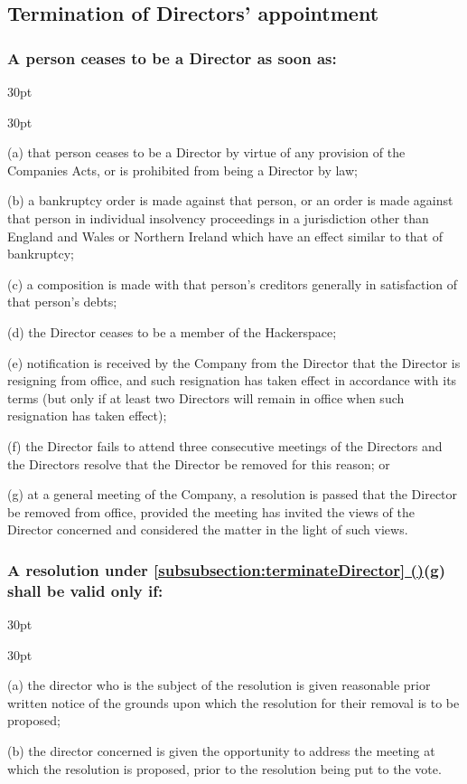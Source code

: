 \documentclass[12pt]{article}
\newcommand*{\fancyref}[1]{\hyperref[{#1}]{\autoref*{#1} (\nameref*{#1})}}
\def\clauseindent{30pt}
\newenvironment{subindentlist}{\raggedright\begin{adjustwidth}{\clauseindent}{}\begin{labeledlist}{\clauseindent}}{\end{labeledlist}\end{adjustwidth}}
\begin{document}
\subsection{Termination of Directors' appointment}
\subsubsection[Automatic termination of Directors]{A person ceases to be a Director as soon as:}\label{subsubsection:terminateDirector}
\begin{subindentlist}
    \item [(a)] that person ceases to be a Director by virtue of any provision of the Companies Acts, or is prohibited from being a Director by law;
    \item [(b)] a bankruptcy order is made against that person, or an order is made against that person in individual insolvency proceedings in a jurisdiction other than England and Wales or Northern Ireland which have an effect similar to that of bankruptcy;
    \item [(c)] a composition is made with that person's creditors generally in satisfaction of that person's debts;
    \item [(d)] the Director ceases to be a member of the Hackerspace;
    \item [(e)] notification is received by the Company from the Director that the Director is resigning from office, and such resignation has taken effect in accordance with its terms (but only if at least two Directors will remain in office when such resignation has taken effect);
    \item [(f)] the Director fails to attend three consecutive meetings of the Directors and the Directors resolve that the Director be removed for this reason; or
    \item [(g)] at a general meeting of the Company, a resolution is passed that the Director be removed from office, provided the meeting has invited the views of the Director concerned and considered the matter in the light of such views.
\end{subindentlist}
\subsubsection[Specifics of resolution to terminate a Director]{A resolution under \fancyref{subsubsection:terminateDirector}(g) shall be valid only if:}
\begin{subindentlist}
    \item [(a)] the director who is the subject of the resolution is given reasonable prior written notice of the grounds upon which the resolution for their removal is to be proposed;
    \item [(b)] the director concerned is given the opportunity to address the meeting at which the resolution is proposed, prior to the resolution being put to the vote.
\end{subindentlist}
\end{document}
